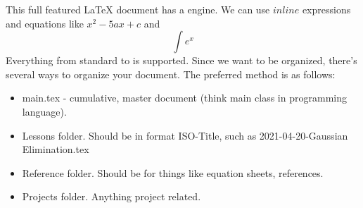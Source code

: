 \markdownRendererUlBegin
\markdownRendererUlItem This full featured LaTeX document has a  engine.\markdownRendererUlItemEnd 
\markdownRendererUlItem We can use $inline$ expressions and equations like $x^2-5ax+c$ and $$\int e^x$$\markdownRendererUlItemEnd 
\markdownRendererUlItem Everything from standard  to  is supported.\markdownRendererUlItemEnd 
\markdownRendererUlEnd \markdownRendererInterblockSeparator
{}\markdownRendererInterblockSeparator
{}\markdownRendererInterblockSeparator
{}Since we want to be organized, there's several ways to organize your document. The preferred method is as follows:\markdownRendererInterblockSeparator
{}\markdownRendererInterblockSeparator
{}\begin{itemize} \item main.tex - cumulative, master document (think main class in programming language). \item Lessons folder. Should be in format ISO-Title, such as 2021-04-20-Gaussian Elimination.tex \item Reference folder. Should be for things like equation sheets, references. \item Projects folder. Anything project related. \end{itemize}\relax